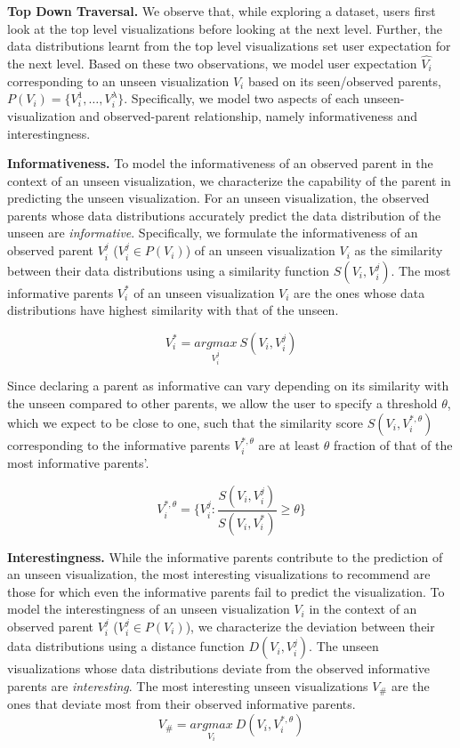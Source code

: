 \textbf{Top Down Traversal.} We observe that, while exploring a dataset, users first look at the top level visualizations before looking at the next level. Further, the data distributions learnt from the top level visualizations set user expectation for the next level. Based on these two observations, we model user expectation $\hat{V_i}$ corresponding to an unseen visualization $V_i$ based on its seen/observed parents, $P(V_i) = \{V_i^1, \ldots, V_i^\lambda\}$. Specifically, we model two aspects of each unseen-visualization and observed-parent relationship, namely informativeness and interestingness. 

\textbf{Informativeness.} To model the informativeness of an observed parent in the context of an unseen visualization, we characterize the capability of the parent in predicting the unseen visualization. For an unseen visualization, the observed parents whose data distributions accurately predict the data distribution of the unseen are \emph{informative}. Specifically, we formulate the informativeness of an observed parent $V_i^j$ ($V_i^j \in P(V_i)$) of an unseen visualization $V_i$ as the similarity between their data distributions using a similarity function $S(V_i, V_i^j)$. The most informative parents $V_i^*$ of an unseen visualization $V_i$ are the ones whose data distributions have highest similarity with that of the unseen.

\begin{equation}
    V_i^*=\underset{V_i^j}{argmax}\ S(V_i, V_i^j)
\end{equation}

Since declaring a parent as informative can vary depending on its similarity with the unseen compared to other parents, we allow the user to specify a threshold $\theta$, which we expect to be close to one, such that the similarity score $S(V_i, V_i^{*, \theta})$ corresponding to the informative parents $V_i^{*, \theta}$ are at least $\theta$ fraction of that of the most informative parents'.

\begin{equation}
    V_i^{*, \theta} = \{V_i^j : \frac{S(V_i, V_i^j)}{S(V_i, V_i^*)} \ge \theta\}
\end{equation}

\textbf{Interestingness.} While the informative parents contribute to the prediction of an unseen visualization, the most interesting visualizations to recommend are those for which even the informative parents fail to predict the visualization. To model the interestingness of an unseen visualization $V_i$ in the context of an observed parent $V_i^j$ ($V_i^j \in P(V_i)$), we characterize the deviation between their data distributions using a distance function $D(V_i, V_i^j)$. The unseen visualizations whose data distributions deviate from the observed informative parents are \emph{interesting}. The most interesting unseen visualizations $V_\#$ are the ones that deviate most from their observed informative parents.
\begin{equation}
    V_\#=\underset{V_i}{argmax} \ D(V_i, V_i^{*, \theta})
\end{equation}

